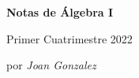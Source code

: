 \documentclass[../main.tex]{subfiles}
\begin{document}
    \begin{titlepage}
        \pagestyle{empty}  \centering

        \huge\textbf{Notas de Álgebra I} 
        \par\vspace{.125cm}

        \Large{Primer Cuatrimestre 2022} 
        \\  \par \vfill

        \Large por \textit{Joan Gonzalez} \par\vspace{.5mm}

        \newpage
        \tableofcontents
    \end{titlepage}
\end{document}
